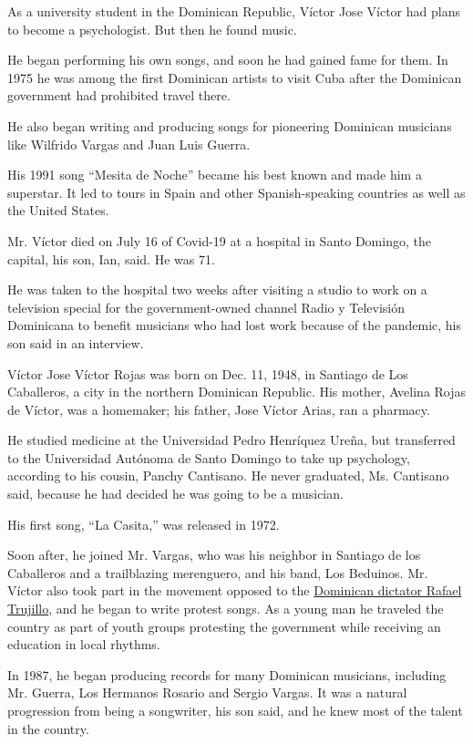 As a university student in the Dominican Republic, Víctor Jose Víctor
had plans to become a psychologist. But then he found music.

He began performing his own songs, and soon he had gained fame for them.
In 1975 he was among the first Dominican artists to visit Cuba after the
Dominican government had prohibited travel there.

He also began writing and producing songs for pioneering Dominican
musicians like Wilfrido Vargas and Juan Luis Guerra.

His 1991 song ``Mesita de Noche'' became his best known and made him a
superstar. It led to tours in Spain and other Spanish-speaking countries
as well as the United States.

Mr. Víctor died on July 16 of Covid-19 at a hospital in Santo Domingo,
the capital, his son, Ian, said. He was 71.

He was taken to the hospital two weeks after visiting a studio to work
on a television special for the government-owned channel Radio y
Televisión Dominicana to benefit musicians who had lost work because of
the pandemic, his son said in an interview.

Víctor Jose Víctor Rojas was born on Dec. 11, 1948, in Santiago de Los
Caballeros, a city in the northern Dominican Republic. His mother,
Avelina Rojas de Víctor, was a homemaker; his father, Jose Víctor Arias,
ran a pharmacy.

He studied medicine at the Universidad Pedro Henríquez Ureña, but
transferred to the Universidad Autónoma de Santo Domingo to take up
psychology, according to his cousin, Panchy Cantisano. He never
graduated, Ms. Cantisano said, because he had decided he was going to be
a musician.

His first song, ``La Casita,'' was released in 1972.

Soon after, he joined Mr. Vargas, who was his neighbor in Santiago de
los Caballeros and a trailblazing merenguero, and his band, Los
Beduinos. Mr. Víctor also took part in the movement opposed to the
\href{https://www.nytimes3xbfgragh.onion/1959/07/06/archives/dominican-dictator-rafael-leonidas-trujillo-molina.html}{Dominican
dictator Rafael Trujillo}, and he began to write protest songs. As a
young man he traveled the country as part of youth groups protesting the
government while receiving an education in local rhythms.

In 1987, he began producing records for many Dominican musicians,
including Mr. Guerra, Los Hermanos Rosario and Sergio Vargas. It was a
natural progression from being a songwriter, his son said, and he knew
most of the talent in the country.

